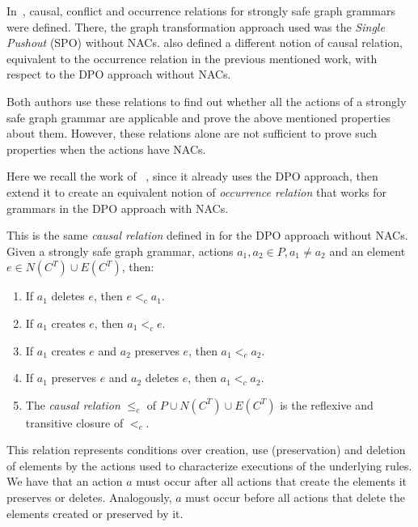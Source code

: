 In~\cite{Ribeiro1996}, causal, conflict and occurrence relations for strongly safe graph grammars were defined. There, the graph transformation approach used was the \emph{Single Pushout} (SPO) without NACs. \cite{Corradini1996} also defined a different notion of causal relation, equivalent to the occurrence relation in the previous mentioned work, with respect to the DPO approach without NACs.

Both authors use these relations to find out whether all the actions of a strongly safe graph grammar are applicable and prove the above mentioned properties about them. However, these relations alone are not sufficient to prove such properties when the actions have NACs.

Here we recall the work of ~\cite{Corradini1996}, since it already uses the DPO approach, then extend it to create an equivalent notion of \emph{occurrence relation} that works for grammars in the DPO approach with NACs.

\begin{definition}\label{def:causal-relation} This is the same \emph{causal relation} defined in \cite{Corradini1996} for the DPO approach without NACs. Given  \doublyTypedGraphGrammarCore{} a strongly safe graph grammar, actions \mbox{$a_1, a_2 \in P, a_1 \ne a_2$} and an element \mbox{$e \in N(C^T) \cup E(C^T)$}, then:

  \begin{enumerate}
    \item If $a_1$ deletes $e$, then $e <_c a_1$.
    \item If $a_1$ creates $e$, then $a_1 <_c e$.
    \item If $a_1$ creates $e$ and $a_2$ preserves $e$, then $a_1 <_c a_2$.
    \item If $a_1$ preserves $e$ and $a_2$ deletes $e$, then $a_1 <_c a_2$. 
    \item The \emph{causal relation} $\leq_c$ of $P \cup N(C^T) \cup E(C^T)$ is the reflexive and transitive closure of $<_c$.
  \end{enumerate}\end{definition}

This relation represents conditions over creation, use (preservation) and deletion of elements by the actions used to characterize executions of the underlying rules. We have that an action $a$ must occur after all actions that create the elements it preserves or deletes. Analogously, $a$ must occur before all actions that delete the elements created or preserved by it.

